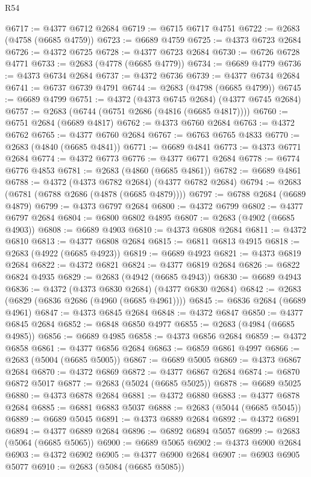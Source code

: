 \begin{lexlean}{R54}
\begin{coremodule}
@6717 := @4377 @6712 @2684
@6719 := @6715 @6717 @4751
@6722 := @2683 (@4758 (@6685 @4759))
@6723 := @6689 @4759
@6725 := @4373 @6723 @2684
@6726 := @4372 @6725
@6728 := @4377 @6723 @2684
@6730 := @6726 @6728 @4771
@6733 := @2683 (@4778 (@6685 @4779))
@6734 := @6689 @4779
@6736 := @4373 @6734 @2684
@6737 := @4372 @6736
@6739 := @4377 @6734 @2684
@6741 := @6737 @6739 @4791
@6744 := @2683 (@4798 (@6685 @4799))
@6745 := @6689 @4799
@6751 := @4372 (@4373 @6745 @2684) (@4377 @6745 @2684)
@6757 := @2683 (@6744 (@6751 @2686 (@4816 (@6685 @4817))))
@6760 := @6751 @2684 (@6689 @4817)
@6762 := @4373 @6760 @2684
@6763 := @4372 @6762
@6765 := @4377 @6760 @2684
@6767 := @6763 @6765 @4833
@6770 := @2683 (@4840 (@6685 @4841))
@6771 := @6689 @4841
@6773 := @4373 @6771 @2684
@6774 := @4372 @6773
@6776 := @4377 @6771 @2684
@6778 := @6774 @6776 @4853
@6781 := @2683 (@4860 (@6685 @4861))
@6782 := @6689 @4861
@6788 := @4372 (@4373 @6782 @2684) (@4377 @6782 @2684)
@6794 := @2683 (@6781 (@6788 @2686 (@4878 (@6685 @4879))))
@6797 := @6788 @2684 (@6689 @4879)
@6799 := @4373 @6797 @2684
@6800 := @4372 @6799
@6802 := @4377 @6797 @2684
@6804 := @6800 @6802 @4895
@6807 := @2683 (@4902 (@6685 @4903))
@6808 := @6689 @4903
@6810 := @4373 @6808 @2684
@6811 := @4372 @6810
@6813 := @4377 @6808 @2684
@6815 := @6811 @6813 @4915
@6818 := @2683 (@4922 (@6685 @4923))
@6819 := @6689 @4923
@6821 := @4373 @6819 @2684
@6822 := @4372 @6821
@6824 := @4377 @6819 @2684
@6826 := @6822 @6824 @4935
@6829 := @2683 (@4942 (@6685 @4943))
@6830 := @6689 @4943
@6836 := @4372 (@4373 @6830 @2684) (@4377 @6830 @2684)
@6842 := @2683 (@6829 (@6836 @2686 (@4960 (@6685 @4961))))
@6845 := @6836 @2684 (@6689 @4961)
@6847 := @4373 @6845 @2684
@6848 := @4372 @6847
@6850 := @4377 @6845 @2684
@6852 := @6848 @6850 @4977
@6855 := @2683 (@4984 (@6685 @4985))
@6856 := @6689 @4985
@6858 := @4373 @6856 @2684
@6859 := @4372 @6858
@6861 := @4377 @6856 @2684
@6863 := @6859 @6861 @4997
@6866 := @2683 (@5004 (@6685 @5005))
@6867 := @6689 @5005
@6869 := @4373 @6867 @2684
@6870 := @4372 @6869
@6872 := @4377 @6867 @2684
@6874 := @6870 @6872 @5017
@6877 := @2683 (@5024 (@6685 @5025))
@6878 := @6689 @5025
@6880 := @4373 @6878 @2684
@6881 := @4372 @6880
@6883 := @4377 @6878 @2684
@6885 := @6881 @6883 @5037
@6888 := @2683 (@5044 (@6685 @5045))
@6889 := @6689 @5045
@6891 := @4373 @6889 @2684
@6892 := @4372 @6891
@6894 := @4377 @6889 @2684
@6896 := @6892 @6894 @5057
@6899 := @2683 (@5064 (@6685 @5065))
@6900 := @6689 @5065
@6902 := @4373 @6900 @2684
@6903 := @4372 @6902
@6905 := @4377 @6900 @2684
@6907 := @6903 @6905 @5077
@6910 := @2683 (@5084 (@6685 @5085))

\end{coremodule}
\end{lexlean}
